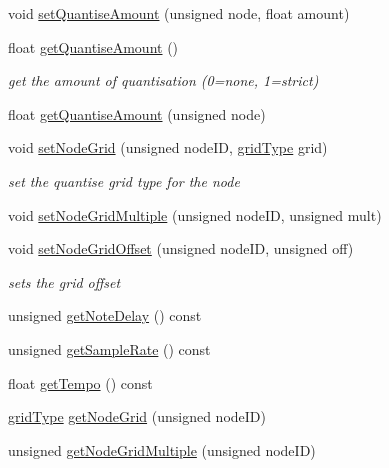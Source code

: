 \begin{DoxyCompactItemize}
void \mbox{\hyperlink{classQuantisedEventQueue_aee5e2fa3c8fe5cf7ab23d2da94c97fb2}{set\+Quantise\+Amount}} (unsigned node, float amount)
\item 
float \mbox{\hyperlink{classQuantisedEventQueue_aaef3b89d1b622c3a2b3a96862d55f12d}{get\+Quantise\+Amount}} ()
\begin{DoxyCompactList}\small\item\em get the amount of quantisation (0=none, 1=strict) \end{DoxyCompactList}\item 
float \mbox{\hyperlink{classQuantisedEventQueue_a009ee8815cadef590721c7c20edf57d6}{get\+Quantise\+Amount}} (unsigned node)
\item 
void \mbox{\hyperlink{classQuantisedEventQueue_a38904e3d52d5ff1c12a341cb8c1d7336}{set\+Node\+Grid}} (unsigned node\+ID, \mbox{\hyperlink{classQuantisedEventQueue_ae186d50bd503038452edbbdd0c7c259e}{grid\+Type}} grid)
\begin{DoxyCompactList}\small\item\em set the quantise grid type for the node \end{DoxyCompactList}\item 
void \mbox{\hyperlink{classQuantisedEventQueue_ac89afce9a33fbec4bfc289fee3c1a704}{set\+Node\+Grid\+Multiple}} (unsigned node\+ID, unsigned mult)
\item 
void \mbox{\hyperlink{classQuantisedEventQueue_a624f66343d287393ee644ce75e0e276a}{set\+Node\+Grid\+Offset}} (unsigned node\+ID, unsigned off)
\begin{DoxyCompactList}\small\item\em sets the grid offset \end{DoxyCompactList}\item 
unsigned \mbox{\hyperlink{classQuantisedEventQueue_a2392d1fb1f7bd008506e36d0eb924052}{get\+Note\+Delay}} () const
\item 
unsigned \mbox{\hyperlink{classQuantisedEventQueue_a23e1fa488702fee980e6cd9103a64a76}{get\+Sample\+Rate}} () const
\item 
float \mbox{\hyperlink{classQuantisedEventQueue_aca272ceaa222502b341d70a566a678ed}{get\+Tempo}} () const
\item 
\mbox{\hyperlink{classQuantisedEventQueue_ae186d50bd503038452edbbdd0c7c259e}{grid\+Type}} \mbox{\hyperlink{classQuantisedEventQueue_a9911be9983ea940de9e170a82dd9cd54}{get\+Node\+Grid}} (unsigned node\+ID)
\item 
unsigned \mbox{\hyperlink{classQuantisedEventQueue_a405616c44942ca195981be37f7d7a81d}{get\+Node\+Grid\+Multiple}} (unsigned node\+ID)

\end{DoxyCompactItemize}
